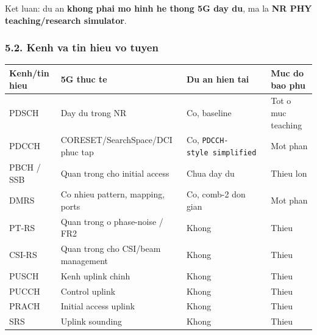 \documentclass[
  vietnamese,
  a4paper,
  11pt]{article}
\newcounter{none} %
\begin{document}
Ket luan: du an \textbf{khong phai mo hinh he thong 5G day du}, ma la
\textbf{NR PHY teaching/research simulator}.

\subsubsection{5.2. Kenh va tin hieu vo
tuyen}\label{kenh-va-tin-hieu-vo-tuyen}

{\def\LTcaptype{none} %
\begin{longtable}[]{@{}
  >{\raggedright\arraybackslash}p{}
  >{\raggedright\arraybackslash}p{}
  >{\raggedright\arraybackslash}p{}
  >{\raggedright\arraybackslash}p{}@{}}
\toprule\noalign{}
\begin{minipage}[b]{\linewidth}\raggedright
Kenh/tin hieu
\end{minipage} & \begin{minipage}[b]{\linewidth}\raggedright
5G thuc te
\end{minipage} & \begin{minipage}[b]{\linewidth}\raggedright
Du an hien tai
\end{minipage} & \begin{minipage}[b]{\linewidth}\raggedright
Muc do bao phu
\end{minipage} \\
\midrule\noalign{}
\endhead
\bottomrule\noalign{}
\endlastfoot
PDSCH & Day du trong NR & Co, baseline & Tot o muc teaching \\
PDCCH & CORESET/SearchSpace/DCI phuc tap & Co,
\texttt{PDCCH-style\ simplified} & Mot phan \\
PBCH / SSB & Quan trong cho initial access & Chua day du & Thieu lon \\
DMRS & Co nhieu pattern, mapping, ports & Co, comb-2 don gian & Mot
phan \\
PT-RS & Quan trong o phase-noise / FR2 & Khong & Thieu \\
CSI-RS & Quan trong cho CSI/beam management & Khong & Thieu \\
PUSCH & Kenh uplink chinh & Khong & Thieu \\
PUCCH & Control uplink & Khong & Thieu \\
PRACH & Initial access uplink & Khong & Thieu \\
SRS & Uplink sounding & Khong & Thieu \\
\end{longtable}
}
\end{document}

